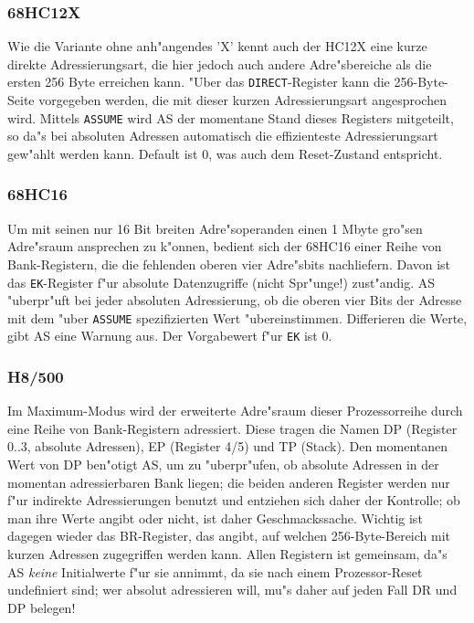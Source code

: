 \documentclass[12pt,a4paper,twoside]{report}
\newcommand{\tty}[1]{{\tt #1}}
\begin{document}
{%

\subsubsection{68HC12X}

Wie die Variante ohne anh"angendes 'X' kennt auch der HC12X eine kurze
direkte Adressierungsart, die hier jedoch auch andere Adre"sbereiche als
die ersten 256 Byte erreichen kann.  "Uber das {\tt DIRECT}-Register kann
die 256-Byte-Seite vorgegeben werden, die mit dieser kurzen
Adressierungsart angesprochen wird.  Mittels {\tt ASSUME} wird AS der
momentane Stand dieses Registers mitgeteilt, so da"s bei absoluten
Adressen automatisch die effizienteste Adressierungsart gew"ahlt werden
kann.  Default ist 0, was auch dem Reset-Zustand entspricht.

\subsubsection{68HC16}

Um mit seinen nur 16 Bit breiten Adre"soperanden einen 1 Mbyte gro"sen
Adre"sraum ansprechen zu k"onnen, bedient sich der 68HC16 einer Reihe
von Bank-Registern, die die fehlenden oberen vier Adre"sbits nachliefern.  
Davon ist das \tty{EK}-Register f"ur absolute Datenzugriffe (nicht
Spr"unge!) zust"andig.  AS "uberpr"uft bei jeder absoluten Adressierung,
ob die oberen vier Bits der Adresse mit dem "uber \tty{ASSUME} 
spezifizierten Wert "ubereinstimmen.  Differieren die Werte, gibt AS eine 
Warnung aus.  Der Vorgabewert f"ur \tty{EK} ist 0.


\subsubsection{H8/500}

Im Maximum-Modus wird der erweiterte Adre"sraum dieser Prozessorreihe
durch eine Reihe von Bank-Registern adressiert.  Diese tragen die
Namen DP (Register 0..3, absolute Adressen), EP (Register 4/5) und
TP (Stack).  Den momentanen Wert von DP ben"otigt AS, um zu "uberpr"ufen,
ob absolute Adressen in der momentan adressierbaren Bank liegen;
die beiden anderen Register werden nur f"ur indirekte Adressierungen
benutzt und entziehen sich daher der Kontrolle; ob man ihre Werte
angibt oder nicht, ist daher Geschmackssache.  Wichtig ist dagegen
wieder das BR-Register, das angibt, auf welchen 256-Byte-Bereich
mit kurzen Adressen zugegriffen werden kann.  Allen Registern ist
gemeinsam, da"s AS {\em keine} Initialwerte f"ur sie annimmt, da sie nach
einem Prozessor-Reset undefiniert sind; wer absolut adressieren
will, mu"s daher auf jeden Fall DR und DP belegen!

}
\end{document}
